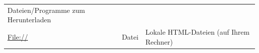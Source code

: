 \documentclass[]{book}
\theoremstyle{definition}
\theoremstyle{definition}
\theoremstyle{definition}
\theoremstyle{remark}
\begin{document}
\begin{longtable}[]{@{}lll@{}}
\begin{minipage}[t]{0.33\columnwidth}
Dateien/Programme zum Herunterladen \vspace{5mm}\strut
\end{minipage}\tabularnewline
\begin{minipage}[t]{0.31\columnwidth}\raggedright\strut
\url{File://} \vspace{5mm}\strut
\end{minipage} & \begin{minipage}[t]{0.27\columnwidth}\raggedright\strut
Datei \vspace{5mm}\strut
\end{minipage} & \begin{minipage}[t]{0.33\columnwidth}\raggedright\strut
Lokale HTML-Dateien (auf Ihrem Rechner) \vspace{5mm}\strut
\end{minipage}\tabularnewline
\bottomrule
\end{longtable}
\end{document}

